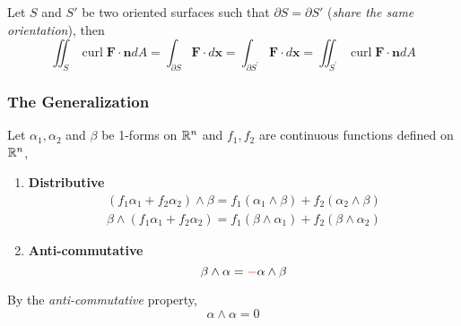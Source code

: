 \documentclass[11pt]{article}
\begin{document}
			\begin{theorem}
				Let $S$ and $S'$ be two oriented surfaces such that $\partial S = \partial S'$ (\emph{share the same orientation}), then 
				\begin{equation}
					\iint_{S} \operatorname{curl} \mathbf{F} \cdot \mathbf{n} d A=\int_{\partial S} \mathbf{F} \cdot d \mathbf{x}=\int_{\partial S^{\prime}} \mathbf{F} \cdot d \mathbf{x}=\iint_{S^{\prime}} \operatorname{curl} \mathbf{F} \cdot \mathbf{n} d A
				\end{equation}
			\end{theorem}
			
		\subsubsection{The Generalization}
			\begin{proposition} Let $\alpha_1, \alpha_2$ and $\beta$ be 1-forms on $\mathbb{R}^n$ and $f_1, f_2$ are continuous functions defined on $\mathbb{R}^n$,
				\begin{enumerate}
					\item \textbf{Distributive}
					\begin{gather}
						(f_1 \alpha_1 + f_2 \alpha_2) \land \beta = f_1(\alpha_1 \land \beta) + f_2 (\alpha_2 \land \beta) \\
						\beta \land (f_1 \alpha_1 + f_2 \alpha_2) = f_1 (\beta \land \alpha_1) + f_2 (\beta \land \alpha_2)
					\end{gather}
					\item \textbf{Anti-commutative}
					\begin{equation}
						\beta \land \alpha = \textcolor{red}{-} \alpha \land \beta
					\end{equation}
				\end{enumerate}
			\end{proposition}
			
			\begin{corollary}
				By the \emph{anti-commutative} property,
				\begin{equation}
					\alpha \land \alpha = 0
				\end{equation}
			\end{corollary}
			
\end{document}
